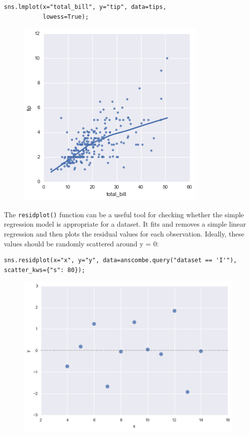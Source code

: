 \documentclass{beamer}
\begin{document}
\begin{frame}[fragile]
	\large
	\begin{framed}
\begin{verbatim}
sns.lmplot(x="total_bill", y="tip", data=tips,
           lowess=True);
           \end{verbatim}
        \end{framed}
\begin{figure}
	\centering
	\includegraphics[width=0.7\linewidth]{images/regression_33_0}
\end{figure}

\end{frame}
\begin{frame}[fragile]
	\large
	

The \texttt{residplot()} function can be a useful tool for checking whether the simple regression model is appropriate for a dataset. It fits and removes a simple linear regression and then plots the residual values for each observation. Ideally, these values should be randomly scattered around y = 0:

\begin{verbatim}
sns.residplot(x="x", y="y", data=anscombe.query("dataset == 'I'"),
scatter_kws={"s": 80});
\end{verbatim}

\begin{figure}
	\centering
	\includegraphics[width=0.7\linewidth]{images/regression_35_0}
\end{figure}
\end{frame}
\end{document}
